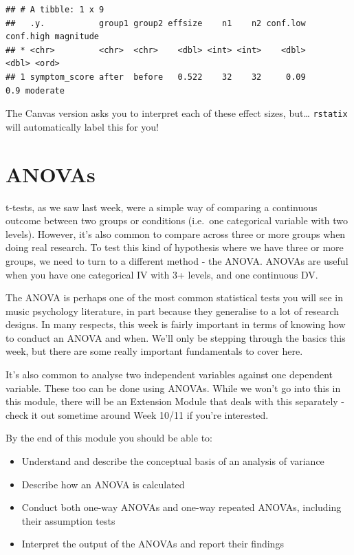 \documentclass[
]{book}
\providecommand{\tightlist}{%
  \setlength{\itemsep}{0pt}\setlength{\parskip}{0pt}}
\begin{document}
\begin{verbatim}
## # A tibble: 1 x 9
##   .y.           group1 group2 effsize    n1    n2 conf.low conf.high magnitude
## * <chr>         <chr>  <chr>    <dbl> <int> <int>    <dbl>     <dbl> <ord>    
## 1 symptom_score after  before   0.522    32    32     0.09       0.9 moderate
\end{verbatim}

The Canvas version asks you to interpret each of these effect sizes, but\ldots{} \texttt{rstatix} will automatically label this for you!

\hypertarget{anovas}{%
\chapter{ANOVAs}\label{anovas}}

t-tests, as we saw last week, were a simple way of comparing a
continuous outcome between two groups or conditions (i.e.~one
categorical variable with two levels). However, it's also common to
compare across three or more groups when doing real research. To test
this kind of hypothesis where we have three or more groups, we need to
turn to a different method - the ANOVA. ANOVAs are useful when you have
one categorical IV with 3+ levels, and one continuous DV.

The ANOVA is perhaps one of the most common statistical tests you will
see in music psychology literature, in part because they generalise to a
lot of research designs. In many respects, this week is fairly important
in terms of knowing how to conduct an ANOVA and when. We'll only be
stepping through the basics this week, but there are some really
important fundamentals to cover here.

It's also common to analyse two independent variables against one
dependent variable. These too can be done using ANOVAs. While we won't
go into this in this module, there will be an Extension Module that
deals with this separately - check it out sometime around Week 10/11 if
you're interested.

By the end of this module you should be able to:

\begin{itemize}
\tightlist
\item
  Understand and describe the conceptual basis of an analysis of
  variance
\item
  Describe how an ANOVA is calculated
\item
  Conduct both one-way ANOVAs and one-way repeated ANOVAs, including
  their assumption tests
\item
  Interpret the output of the ANOVAs and report their findings
\end{itemize}
\end{document}
